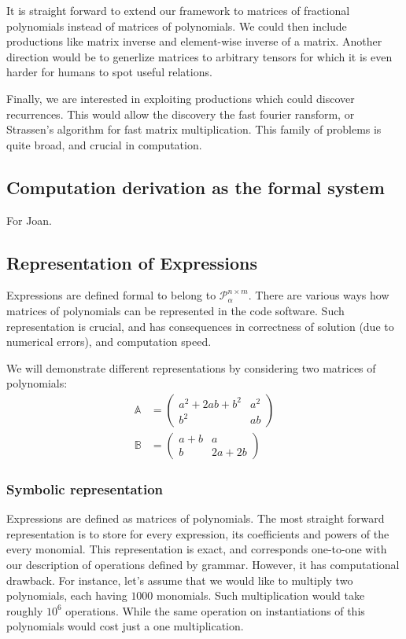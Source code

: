 It is straight forward to extend our framework to matrices of fractional
polynomials instead of matrices of polynomials.  We could
then include productions like matrix inverse and element-wise inverse of
a matrix.  Another direction would be to generlize matrices to arbitrary tensors
for which it is even harder for humans to spot useful relations.

Finally, we are interested in exploiting productions which could discover 
recurrences. This would allow the discovery the fast fourier ransform, or
Strassen's algorithm for fast matrix multiplication. This family of problems is quite broad,
and crucial in computation.

\subsection{Computation derivation as the formal system}

For Joan.

\subsection{Representation of Expressions}
Expressions are defined formal to belong to $\mathcal{P}^{n \times m}_\alpha$. There are various
ways how matrices of polynomials can be represented in the code software. Such representation is crucial, and has consequences in
 correctness of solution (due to numerical errors), and computation speed.

We will demonstrate different representations by considering two matrices of polynomials:
\begin{align*}
\mathbb{A} &= \begin{pmatrix} a^2 + 2ab + b^2 & a^2\\ b^2 & ab \end{pmatrix}\\
\mathbb{B} &= \begin{pmatrix} a + b & a\\ b & 2a + 2b \end{pmatrix}
\end{align*}


\subsubsection{Symbolic representation}
Expressions are defined as matrices of polynomials. The most straight forward 
representation is to store for every expression, its coefficients and powers of the every monomial.
This representation is exact, and corresponds one-to-one with our description of operations
defined by grammar. However, it has computational drawback. 
For instance, let's assume that we would like to multiply two polynomials, each having $1000$ monomials.
Such multiplication would take roughly $10^6$ operations. While the same operation on instantiations of
this polynomials would cost just a one multiplication.


